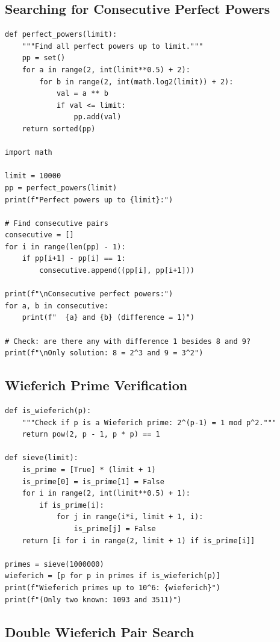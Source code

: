 \subsection{Searching for Consecutive Perfect Powers}

\begin{verbatim}
def perfect_powers(limit):
    """Find all perfect powers up to limit."""
    pp = set()
    for a in range(2, int(limit**0.5) + 2):
        for b in range(2, int(math.log2(limit)) + 2):
            val = a ** b
            if val <= limit:
                pp.add(val)
    return sorted(pp)

import math

limit = 10000
pp = perfect_powers(limit)
print(f"Perfect powers up to {limit}:")

# Find consecutive pairs
consecutive = []
for i in range(len(pp) - 1):
    if pp[i+1] - pp[i] == 1:
        consecutive.append((pp[i], pp[i+1]))

print(f"\nConsecutive perfect powers:")
for a, b in consecutive:
    print(f"  {a} and {b} (difference = 1)")

# Check: are there any with difference 1 besides 8 and 9?
print(f"\nOnly solution: 8 = 2^3 and 9 = 3^2")
\end{verbatim}

\subsection{Wieferich Prime Verification}

\begin{verbatim}
def is_wieferich(p):
    """Check if p is a Wieferich prime: 2^(p-1) = 1 mod p^2."""
    return pow(2, p - 1, p * p) == 1

def sieve(limit):
    is_prime = [True] * (limit + 1)
    is_prime[0] = is_prime[1] = False
    for i in range(2, int(limit**0.5) + 1):
        if is_prime[i]:
            for j in range(i*i, limit + 1, i):
                is_prime[j] = False
    return [i for i in range(2, limit + 1) if is_prime[i]]

primes = sieve(1000000)
wieferich = [p for p in primes if is_wieferich(p)]
print(f"Wieferich primes up to 10^6: {wieferich}")
print(f"(Only two known: 1093 and 3511)")
\end{verbatim}

\subsection{Double Wieferich Pair Search}

